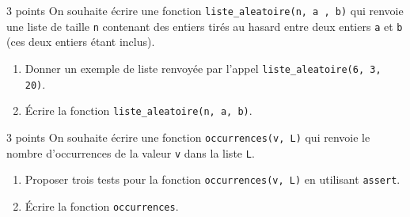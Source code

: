 \documentclass[a4paper,dvipsnames]{article}
\begin{document}
\medskip

\begin{exercice}{3 points}{}
  On souhaite écrire une fonction \texttt{liste_aleatoire(n, a , b)} qui renvoie une liste de taille \texttt{n} contenant des entiers tirés au hasard entre deux entiers \texttt{a} et \texttt{b} (ces deux entiers étant inclus).
  \begin{enumerate}
    \item Donner un exemple de liste renvoyée par l'appel \texttt{liste_aleatoire(6, 3, 20)}.
    \item Écrire la fonction \texttt{liste_aleatoire(n, a, b)}.
  \end{enumerate}
\end{exercice}

\medskip

\begin{exercice}{3 points}{}
  On souhaite écrire une fonction \texttt{occurrences(v, L)} qui renvoie le nombre d'occurrences de la valeur \texttt{v} dans la liste \texttt{L}.
  \begin{enumerate}
    \item Proposer trois tests pour la fonction \texttt{occurrences(v, L)} en utilisant \texttt{assert}.
    \item Écrire la fonction \texttt{occurrences}.
  \end{enumerate}
\end{exercice}

\medskip
\end{document}
